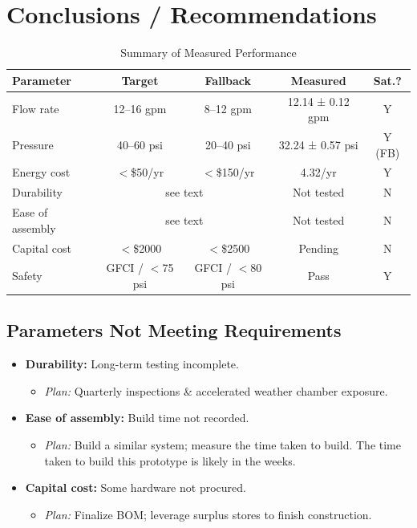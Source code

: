 \documentclass[12pt]{report}
\begin{document}
\newpage\section{Conclusions / Recommendations}
\begin{table}[h]
  \centering
  \caption{Summary of Measured Performance}
  \begin{tabular}{@{}lcccc@{}}
    \toprule
    Parameter      & Target           & Fallback        & Measured             & Sat.? \\
    \midrule
    Flow rate      & 12--16 gpm       & 8--12 gpm       & 12.14 ± 0.12 gpm       & Y     \\
    Pressure       & 40--60 psi       & 20--40 psi      & 32.24 ± 0.57 psi     & Y (FB)
    \\
    Energy cost    & $<$\$50/yr         & $<$\$150/yr       & 4.32/yr              & Y     \\
    Durability     & \multicolumn{2}{c}{see text} & Not tested            & N     \\
    Ease of assembly & \multicolumn{2}{c}{see text} & Not tested            & N     \\
    Capital cost   & $<$\$2000          & $<$\$2500         & Pending               & N     \\
    Safety         & GFCI / $<$75 psi   & GFCI / $<$80 psi  & Pass                  & Y     \\
    \bottomrule
  \end{tabular}
\end{table}

\subsection{Parameters Not Meeting Requirements}
\begin{itemize}[leftmargin=*]
  \item \textbf{Durability:} Long-term testing incomplete.
    \begin{itemize}[leftmargin=*]
      \item \emph{Plan:} Quarterly inspections \& accelerated weather chamber exposure.
    \end{itemize}
  \item \textbf{Ease of assembly:} Build time not recorded.
    \begin{itemize}[leftmargin=*]
      \item \emph{Plan:} Build a similar system; measure the time taken to build. The time taken to build this prototype is likely in the weeks.
    \end{itemize}
  \item \textbf{Capital cost:} Some hardware not procured.
    \begin{itemize}[leftmargin=*]
      \item \emph{Plan:} Finalize BOM; leverage surplus stores to finish construction.
    \end{itemize}
\end{itemize}
\end{document}
